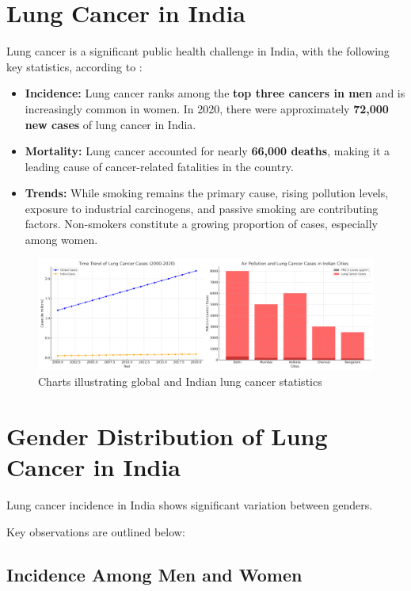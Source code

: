 \section{Lung Cancer in India}
Lung cancer is a significant public health challenge in India, with the following key statistics, according to \cite{singh2021lung}:
\begin{highlight}
\begin{itemize}
    \item \textbf{Incidence:} Lung cancer ranks among the \textbf{top three cancers in men} and is increasingly common in women. In 2020, there were approximately \textbf{72,000 new cases} of lung cancer in India.
    \item \textbf{Mortality:} Lung cancer accounted for nearly \textbf{66,000 deaths}, making it a leading cause of cancer-related fatalities in the country.
    \item \textbf{Trends:} While smoking remains the primary cause, rising pollution levels, exposure to industrial carcinogens, and passive smoking are contributing factors. Non-smokers constitute a growing proportion of cases, especially among women.
\end{itemize}
\end{highlight}
\begin{figure}[h!]
    \centering
    \includegraphics[width=\textwidth]{images/lung_cancer_additional_charts.png}
    \caption{Charts illustrating global and Indian lung cancer statistics}
    \label{fig:lung_stats_2}
\end{figure}
\section{Gender Distribution of Lung Cancer in India}
\begin{remark}
Lung cancer incidence in India shows significant variation between genders. 
\end{remark} 
Key observations are outlined below:

\subsection{Incidence Among Men and Women}

